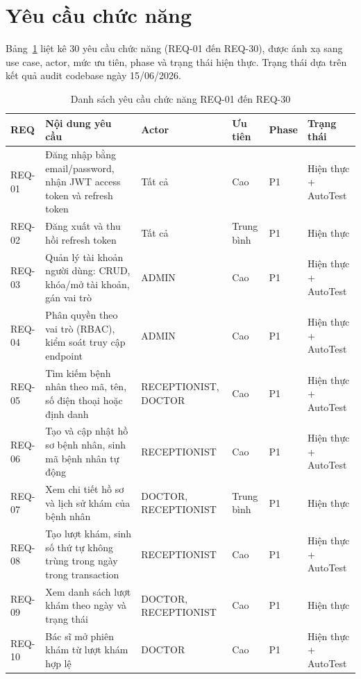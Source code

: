 \section{Yêu cầu chức năng}
\label{sec:srs-functional}

Bảng~\ref{tab:srs-req} liệt kê 30 yêu cầu chức năng (REQ-01 đến REQ-30), được ánh xạ sang use case, actor, mức ưu tiên, phase và trạng thái hiện thực. Trạng thái dựa trên kết quả audit codebase ngày 15/06/2026.

\begin{longtable}{|p{1.5cm}|p{4.8cm}|p{2.3cm}|p{1.5cm}|p{1.3cm}|p{2.0cm}|}
\caption{Danh sách yêu cầu chức năng REQ-01 đến REQ-30}
\label{tab:srs-req}\\
\hline
\textbf{REQ} & \textbf{Nội dung yêu cầu} & \textbf{Actor} & \textbf{Ưu tiên} & \textbf{Phase} & \textbf{Trạng thái} \\
\hline
\endhead
\hline
\endfoot
REQ-01 & Đăng nhập bằng email/password, nhận JWT access token và refresh token & Tất cả & Cao & P1 & Hiện thực + AutoTest \\
\hline
REQ-02 & Đăng xuất và thu hồi refresh token & Tất cả & Trung bình & P1 & Hiện thực \\
\hline
REQ-03 & Quản lý tài khoản người dùng: CRUD, khóa/mở tài khoản, gán vai trò & ADMIN & Cao & P1 & Hiện thực + AutoTest \\
\hline
REQ-04 & Phân quyền theo vai trò (RBAC), kiểm soát truy cập endpoint & ADMIN & Cao & P1 & Hiện thực + AutoTest \\
\hline
REQ-05 & Tìm kiếm bệnh nhân theo mã, tên, số điện thoại hoặc định danh & RECEPTIONIST, DOCTOR & Cao & P1 & Hiện thực + AutoTest \\
\hline
REQ-06 & Tạo và cập nhật hồ sơ bệnh nhân, sinh mã bệnh nhân tự động & RECEPTIONIST & Cao & P1 & Hiện thực + AutoTest \\
\hline
REQ-07 & Xem chi tiết hồ sơ và lịch sử khám của bệnh nhân & DOCTOR, RECEPTIONIST & Trung bình & P1 & Hiện thực \\
\hline
REQ-08 & Tạo lượt khám, sinh số thứ tự không trùng trong ngày trong transaction & RECEPTIONIST & Cao & P1 & Hiện thực + AutoTest \\
\hline
REQ-09 & Xem danh sách lượt khám theo ngày và trạng thái & DOCTOR, RECEPTIONIST & Cao & P1 & Hiện thực \\
\hline
REQ-10 & Bác sĩ mở phiên khám từ lượt khám hợp lệ & DOCTOR & Cao & P1 & Hiện thực + AutoTest \\

\end{longtable}
